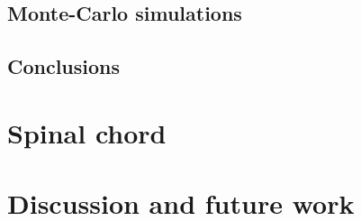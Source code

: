 \documentclass[10pt,english]{report}
\begin{document}
\section{Monte-Carlo simulations}

\section{Conclusions}

\chapter{Spinal chord}

\chapter{Discussion and future work}


\newpage
{}
\renewcommand\bibname{References}


\end{document}
